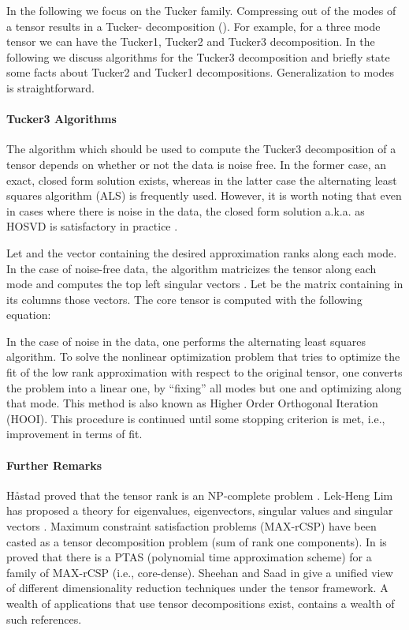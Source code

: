In the following we focus on the Tucker family.
Compressing  out of the  modes of a tensor results in a Tucker- decomposition (\cite{kiers2000}). 
For example, for a three mode tensor we can have the Tucker1, Tucker2 and Tucker3 decomposition. 
In the following we discuss algorithms for the Tucker3 decomposition and briefly state some facts about Tucker2 and Tucker1
decompositions. Generalization to  modes is straightforward. 

\paragraph{Tucker3 Algorithms} 

The algorithm which should be used to compute the Tucker3 decomposition of a tensor 
depends on whether or not the data is noise free. In the former case, an exact, closed
form solution exists, whereas in the latter case the alternating least squares algorithm (ALS)
is frequently used. However, it is worth noting that even in cases where there is noise in the data, 
the closed form solution a.k.a. as HOSVD \cite{tamarasurvey,citeulike:4308452} is satisfactory in practice \cite{luo-2009}. 

Let  and  the vector containing 
the desired approximation ranks along each mode. 
In the case of noise-free data, the algorithm matricizes the tensor along each mode
and computes the  top left singular vectors . Let  be the  matrix
containing in its columns those vectors. The core tensor is computed with the following equation:



In the case of noise in the data, one performs the alternating least squares algorithm. 
To solve the nonlinear optimization problem that tries to optimize the fit of the low rank approximation
with respect to the original tensor, one converts the problem into a linear one, by ``fixing'' all modes
but one and optimizing along that mode. This method is also known as Higher Order Orthogonal Iteration (HOOI). 
This procedure is continued until some stopping criterion is met, i.e.,  improvement in terms of fit.


\paragraph{Further Remarks}
H{\aa}stad proved that the tensor rank is an NP-complete problem \cite{DBLP:journals/jal/Hastad90}.
Lek-Heng Lim has proposed a theory for eigenvalues, eigenvectors, singular values  and singular vectors
\cite{DBLP:journals/corr/abs-math-0607648}. Maximum constraint satisfaction problems  (MAX-rCSP)
have been casted as a tensor decomposition problem (sum of rank one components).
In \cite{1060701} is proved that there is a PTAS (polynomial time approximation scheme) for a family 
of MAX-rCSP (i.e., core-dense). Sheehan and Saad in \cite{saad} give a unified view of different
dimensionality reduction techniques under the tensor framework.
A wealth of applications that use tensor decompositions exist, \cite{tamarasurvey} contains a wealth of such references.




